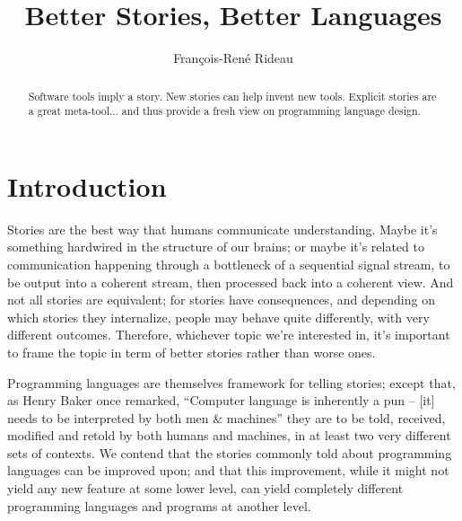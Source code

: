 \documentclass[a4paper,UKenglish]{lipics}
\title{Better Stories, Better Languages}
\author[1]{François-René Rideau}
\affil[1]{TUNES Project\\
  \texttt{fare@tunes.org}}
\begin{document}
\newcommand{\Sad}{Sad...}
\newcommand{\Rad}{Better!}
\newcommand{\Krad}{Even better!}
\newcommand{\proglang}{programming language}
\newcommand{\proglangs}{programming languages}
\newcommand{\PL}{Programming Language}
\newcommand{\SadBetter}[3]{\subsection{#1} \par #2 \par #3 \par}
\newcommand{\SadBetterEvenBetter}[4]{\subsection{#1} \par #2 \par #3 \par #4 \par}


\maketitle

\begin{abstract}
  Software tools imply a story.
  New stories can help invent new tools.
  Explicit stories are a great meta-tool...
  and thus provide a fresh view on programming language design.
\end{abstract}

\section{Introduction}

Stories are the best way that humans communicate understanding.
Maybe it's something hardwired in the structure of our brains;
or maybe it's related to communication happening through a bottleneck
of a sequential signal stream, to be output into a coherent stream,
then processed back into a coherent view.
And not all stories are equivalent; for stories have consequences,
and depending on which stories they internalize,
people may behave quite differently, with very different outcomes.
Therefore, whichever topic we're interested in,
it's important to frame the topic in term of better stories rather than worse ones.

Programming languages are themselves framework for telling stories;
except that, as Henry Baker once remarked, ``Computer language is inherently a pun –
[it] needs to be interpreted by both men \& machines'' \cite{HBaker2005}
they are to be told, received, modified and retold by both humans and machines,
in at least two very different sets of contexts.
We contend that the stories commonly told about programming languages can be improved upon;
and that this improvement, while it might not yield any new feature at some lower level,
can yield completely different programming languages and programs at another level.
\end{document}
